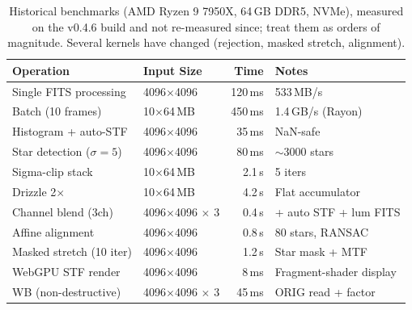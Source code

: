 \documentclass[11pt,a4paper]{article}
\begin{document}
    \begin{table}[H]
        \centering
        \begin{tabular}{llrl}
            \toprule
            \textbf{Operation} & \textbf{Input Size} & \textbf{Time} & \textbf{Notes} \\
            \midrule
            Single FITS processing & 4096$\times$4096 & 120\,ms & 533\,MB/s \\
            Batch (10 frames) & 10$\times$64\,MB & 450\,ms & 1.4\,GB/s (Rayon) \\
            Histogram + auto-STF & 4096$\times$4096 & 35\,ms & NaN-safe \\
            Star detection ($\sigma{=}5$) & 4096$\times$4096 & 80\,ms & $\sim$3000 stars \\
            Sigma-clip stack & 10$\times$64\,MB & 2.1\,s & 5 iters \\
            Drizzle 2$\times$ & 10$\times$64\,MB & 4.2\,s & Flat accumulator \\
            Channel blend (3ch) & 4096$\times$4096 $\times$ 3 & 0.4\,s & + auto STF + lum FITS \\
            Affine alignment & 4096$\times$4096 & 0.8\,s & 80 stars, RANSAC \\
            Masked stretch (10 iter) & 4096$\times$4096 & 1.2\,s & Star mask + MTF \\
            WebGPU STF render & 4096$\times$4096 & 8\,ms & Fragment-shader display \\
            WB (non-destructive) & 4096$\times$4096 $\times$ 3 & 45\,ms & ORIG read + factor \\
            \bottomrule
        \end{tabular}
        \caption{Historical benchmarks (AMD Ryzen 9 7950X, 64\,GB DDR5, NVMe), measured on the v0.4.6 build and not re-measured since; treat them as orders of magnitude. Several kernels have changed (rejection, masked stretch, alignment).}
    \end{table}
\end{document}

